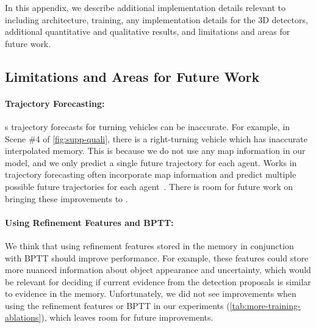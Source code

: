 \clearpage
\setcounter{page}{1}
\maketitlesupplementary

In this appendix, we describe additional implementation details relevant to \ourmodel{}
including architecture, training, any implementation details for the 3D detectors,
additional quantitative and qualitative results,
and limitations and areas for future work.









\subsection{Limitations and Areas for Future Work}

\paragraph{Trajectory Forecasting:}

\ourmodel{}s trajectory forecasts for turning vehicles can be inaccurate.
For example, in Scene \#4 of \cref{fig:supp-quali}, there is a right-turning vehicle which has inaccurate interpolated memory.
This is because we do not use any map information in our model, and we only predict a single future trajectory for each agent.
Works in trajectory forecasting often incorporate map information and predict multiple possible future trajectories for each agent~\cite{cui2023gorela,casas2024detra}.
There is room for future work on bringing these improvements to \ourmodel{}.

\paragraph{Using Refinement Features and BPTT:}

We think that using refinement features stored in the memory in conjunction with BPTT should improve performance.
For example, these features could store more nuanced information about object appearance and uncertainty, which
would be relevant for deciding if current evidence from the detection proposals is similar to evidence in the memory.
Unfortunately, we did not see improvements when using the refinement features or BPTT in our experiments (\cref{tab:more-training-ablations}),
which leaves room for future improvements.

